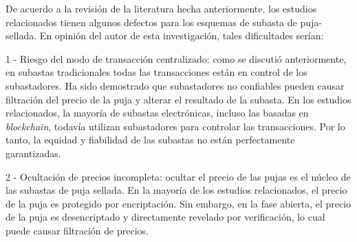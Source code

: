 

    De acuerdo a la revisión de la literatura hecha anteriormente, los estudios relacionados tienen algunos defectos para los 
    esquemas de subasta de puja-sellada. En opinión del autor de esta investigación, tales dificultades serían:

    1 - Riesgo del modo de transacción centralizado: como se discutió anteriormente, en subastas 
    tradicionales todas las transacciones
    están en control de los subastadores. Ha sido demostrado que subastadores no confiables pueden causar filtración del precio de la puja
    y alterar el resultado de la subasta. En los estudios relacionados, la mayoría de subastas electrónicas, incluso las basadas en 
    \textit{blockchain}, todavía utilizan subastadores para controlar las transacciones. Por lo tanto, la equidad y fiabilidad de las 
    subastas no están perfectamente garantizadas.

    2 - Ocultación de precios incompleta: ocultar el precio de las pujas es el núcleo de las subastas de puja sellada. En la mayoría de los estudios 
    relacionados, el precio de la puja es protegido por encriptación. Sin embargo, en la fase abierta, el precio de la puja es desencriptado
    y directamente revelado por verificación, lo cual puede causar filtración de precios.

